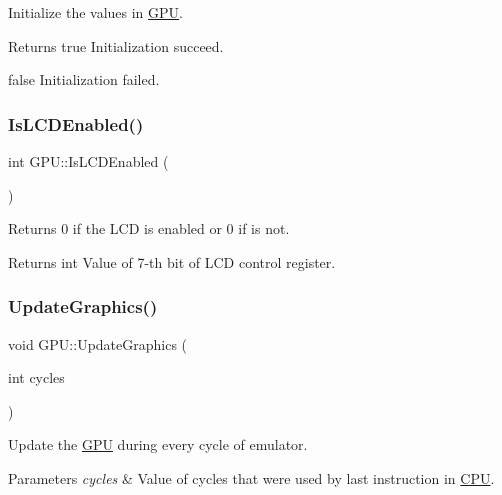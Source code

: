 Initialize the values in \mbox{\hyperlink{classGPU}{G\+PU}}. 

\begin{DoxyReturn}{Returns}
true Initialization succeed. 

false Initialization failed. 
\end{DoxyReturn}
\mbox{\label{classGPU_a6ecd1a465bf7bf337bd5a68b1f2c534f}} 
\subsubsection{\texorpdfstring{Is\+L\+C\+D\+Enabled()}{IsLCDEnabled()}}
{\footnotesize\ttfamily int G\+P\+U\+::\+Is\+L\+C\+D\+Enabled (\begin{DoxyParamCaption}{ }\end{DoxyParamCaption})\hspace{0.3cm}{\ttfamily [private]}}



Returns 0 if the L\+CD is enabled or 0 if is not. 

\begin{DoxyReturn}{Returns}
int Value of 7-\/th bit of L\+CD control register. 
\end{DoxyReturn}
\mbox{\label{classGPU_af0b1df5eb7c5270a81fc12aebb89e641}} 
\subsubsection{\texorpdfstring{Update\+Graphics()}{UpdateGraphics()}}
{\footnotesize\ttfamily void G\+P\+U\+::\+Update\+Graphics (\begin{DoxyParamCaption}\item[{int}]{cycles }\end{DoxyParamCaption})}



Update the \mbox{\hyperlink{classGPU}{G\+PU}} during every cycle of emulator. 


\begin{DoxyParams}{Parameters}
{\em cycles} & Value of cycles that were used by last instruction in \mbox{\hyperlink{classCPU}{C\+PU}}. \\
\hline
\end{DoxyParams}


